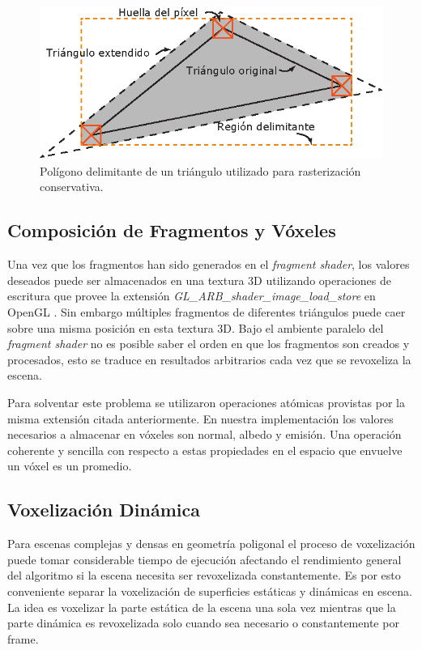 \begin{figure}[H]
	\centering
	\captionsetup{justification=centering}
	\includegraphics[width=0.7\linewidth]{media/conservative_triangle.eps}
	\caption{Polígono delimitante de un triángulo utilizado para rasterización conservativa.}
	\label{fig:expanded_bbpolygon}
\end{figure}


\subsection{Composición de Fragmentos y Vóxeles}
\label{sub:frag_voxels}
Una vez que los fragmentos han sido generados en el \emph{fragment shader}, los valores deseados puede ser almacenados en una textura 3D utilizando operaciones de escritura que provee la extensión \emph{GL\_ARB\_shader\_image\_load\_store} en OpenGL \cite{ImageLoadStore}. Sin embargo múltiples fragmentos de diferentes triángulos puede caer sobre una misma posición en esta textura 3D. Bajo el ambiente paralelo del \emph{fragment shader} no es posible saber el orden en que los fragmentos son creados y procesados, esto se traduce en resultados arbitrarios cada vez que se revoxeliza la escena.

Para solventar este problema se utilizaron operaciones atómicas provistas por la misma extensión citada anteriormente. En nuestra implementación los valores necesarios a almacenar en vóxeles son normal, albedo y emisión. Una operación coherente y sencilla con respecto a estas propiedades en el espacio que envuelve un vóxel es un promedio.

\subsection{Voxelización Dinámica} %
\label{sub:voxelizacion_dinamica}
Para escenas complejas y densas en geometría poligonal el proceso de voxelización puede tomar considerable tiempo de ejecución afectando el rendimiento general del algoritmo si la escena necesita ser revoxelizada constantemente. Es por esto conveniente separar la voxelización de superficies estáticas y dinámicas en escena. La idea es voxelizar la parte estática de la escena una sola vez mientras que la parte dinámica es revoxelizada solo cuando sea necesario o constantemente por frame.


